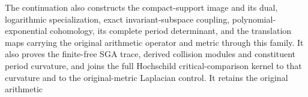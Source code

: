 The continuation also constructs the compact-support image and its dual,
logarithmic specialization, exact invariant-subspace coupling,
polynomial-exponential cohomology, its complete period determinant,
and the translation maps carrying the original arithmetic operator
and metric through this family.
It also proves the finite-free SGA trace, derived collision modules
and constituent period curvature, and joins the full Hochschild
critical-comparison kernel to that curvature and to the
original-metric Laplacian control.
It retains the original arithmetic